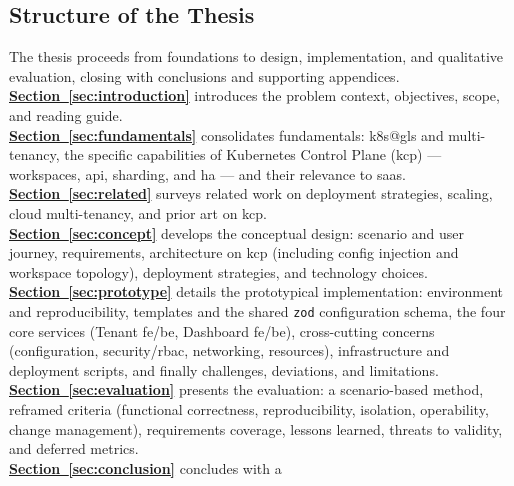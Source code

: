 \documentclass[11pt, a4paper, oneside, listof=totoc]{scrartcl}
\begin{document}
        \subsection{Structure of the Thesis}\label{subsec:structure}
            The thesis proceeds from foundations to design, implementation, and qualitative
            evaluation, closing with conclusions and supporting appendices.\\
            \textbf{\hyperref[sec:introduction]{Section~\ref*{sec:introduction}}} introduces the
            problem context, objectives, scope, and reading guide.\\
            \textbf{\hyperref[sec:fundamentals]{Section~\ref*{sec:fundamentals}}} consolidates
            fundamentals: \gls{k8s@gls} and multi-tenancy, the specific capabilities of Kubernetes
            Control Plane (\gls{kcp}) --- workspaces, \gls{api}, sharding, and \gls{ha} --- and
            their relevance to \gls{saas}.\\
            \textbf{\hyperref[sec:related]{Section~\ref*{sec:related}}} surveys related work on
            deployment strategies, scaling, cloud multi-tenancy, and prior art on \gls{kcp}.\\
            \textbf{\hyperref[sec:concept]{Section~\ref*{sec:concept}}} develops the conceptual
            design: scenario and user journey, requirements, architecture on \gls{kcp} (including
            config injection and workspace topology), deployment strategies, and technology
            choices.\\
            \textbf{\hyperref[sec:prototype]{Section~\ref*{sec:prototype}}} details the prototypical
            implementation: environment and reproducibility, templates and the shared \texttt{zod}
            configuration schema, the four core services (Tenant \gls{fe}/\gls{be}, Dashboard
            \gls{fe}/\gls{be}), cross-cutting concerns (configuration, security/\gls{rbac},
            networking, resources), infrastructure and deployment scripts, and finally challenges,
            deviations, and limitations.\\
            \textbf{\hyperref[sec:evaluation]{Section~\ref*{sec:evaluation}}} presents the
            evaluation: a scenario-based method, reframed criteria (functional correctness,
            reproducibility, isolation, operability, change management), requirements coverage,
            lessons learned, threats to validity, and deferred metrics.\\
            \textbf{\hyperref[sec:conclusion]{Section~\ref*{sec:conclusion}}} concludes with a
\end{document}
